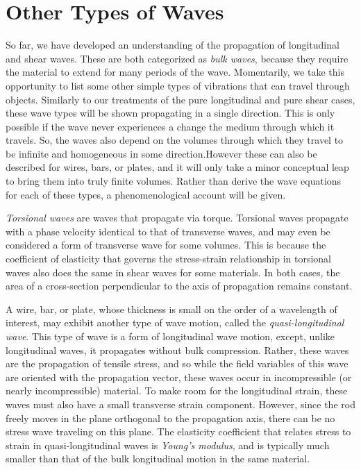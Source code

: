 \documentclass[a4paper,10pt]{report}
\numberwithin{equation}{section}
\begin{document}
\section{Other Types of Waves}\label{sec:waves}

So far, we have developed an understanding of the propagation of longitudinal and shear waves. These are both categorized as \emph{bulk waves}, because they require the material to extend for many periods of the wave. Momentarily, we take this opportunity to list some other simple types of vibrations that can travel through objects. Similarly to our treatments of the pure longitudinal and pure shear cases, these wave types will be shown propagating in a single direction. This is only possible if the wave never experiences a change the medium through which it travels. So, the waves also depend on the volumes through which they travel to be infinite and homogeneous in some direction.However these can also be described for wires, bars, or plates, and it will only take a minor conceptual leap to bring them into truly finite volumes. Rather than derive the wave equations for each of these types, a phenomenological account will be given.

\emph{Torsional waves} are waves that propagate via torque. Torsional waves propagate with a phase velocity identical to that of transverse waves, and may even be considered a form of transverse wave for some volumes. This is because the coefficient of elasticity that governs the stress-strain relationship in torsional waves also does the same in shear waves for some materials. In both cases, the area of a cross-section perpendicular to the axis of propagation remains constant. \cite[p.~90]{Cremer1973}

A wire, bar, or plate, whose thickness is small on the order of a wavelength of interest, may exhibit another type of wave motion, called the \emph{quasi-longitudinal wave}.\cite[p.~80]{Cremer1973} This type of wave is a form of longitudinal wave motion, except, unlike longitudinal waves, it propagates without bulk compression. Rather, these waves are the propagation of tensile stress, and so while the field variables of this wave are oriented with the propagation vector, these waves occur in incompressible (or nearly incompressible) material. To make room for the longitudinal strain, these waves must also have a small transverse strain component. However, since the rod freely moves in the plane orthogonal to the propagation axis, there can be no stress wave traveling on this plane. The elasticity coefficient that relates stress to strain in quasi-longitudinal waves is \emph{Young's modulus}, and is typically much smaller than that of the bulk longitudinal motion in the same material.  \cite[p.~14]{
Kino1987}
\end{document}
